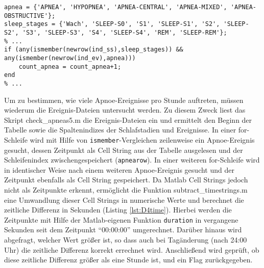 \begin{lstlisting}[caption={Implementierung Kriterium D4 in Skript count\_apneas.m}, label={lst:D4}]
apnea = {'APNEA', 'HYPOPNEA', 'APNEA-CENTRAL', 'APNEA-MIXED', 'APNEA-OBSTRUCTIVE'};
sleep_stages = {'Wach', 'SLEEP-S0', 'S1', 'SLEEP-S1', 'S2', 'SLEEP-S2', 'S3', 'SLEEP-S3', 'S4', 'SLEEP-S4', 'REM', 'SLEEP-REM'};
% ...
if (any(ismember(newrow(ind_ss),sleep_stages)) && any(ismember(newrow(ind_ev),apnea)))
    count_apnea = count_apnea+1;
end
% ...
\end{lstlisting}

Um zu bestimmen, wie viele Apnoe-Ereignisse pro Stunde auftreten, müssen wiederum die Ereignis-Dateien untersucht werden. Zu diesem Zweck liest das Skript check\_apneas5.m die Ereignis-Dateien ein und ermittelt den Beginn der Tabelle sowie die Spaltenindizes der Schlafstadien und Ereignisse. In einer for-Schleife wird mit Hilfe von \texttt{ismember}-Vergleichen zeilenweise ein Apnoe-Ereignis gesucht, dessen Zeitpunkt als Cell String aus der Tabelle ausgelesen und der Schleifenindex zwischengespeichert (\texttt{apnearow}). In einer weiteren for-Schleife wird in identischer Weise nach einem weiteren Apnoe-Ereignis gesucht und der Zeitpunkt ebenfalls als Cell String gespeichert. Da Matlab Cell Strings jedoch nicht als Zeitpunkte erkennt, ermöglicht die Funktion subtract\_timestrings.m eine Umwandlung dieser Cell Strings in numerische Werte und berechnet die zeitliche Differenz in Sekunden (Listing \ref{lst:D4time}). Hierbei werden die Zeitpunkte mit Hilfe der Matlab-eigenen Funktion \texttt{duration} in vergangene Sekunden seit dem Zeitpunkt "`00:00:00"' umgerechnet. Darüber hinaus wird abgefragt, welcher Wert größer ist, so dass auch bei Tagänderung (nach 24:00 Uhr) die zeitliche Differenz korrekt errechnet wird. Anschließend wird geprüft, ob diese zeitliche Differenz größer als eine Stunde ist, und ein Flag zurückgegeben.\\

